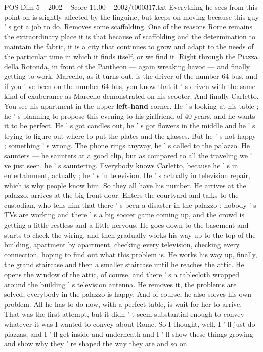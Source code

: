 \begin{textsample}{POS Dim 5 – 2002 – Score 11.00 – 2002/t000317.txt}
Everything he sees from this point on is slightly affected by the linguine, but keeps on moving because this guy ' s got a job to do.
Removes some scaffolding.
One of the reasons Rome remains the extraordinary place it is that because of scaffolding and the determination to maintain the fabric, it is a city that continues to grow and adapt to the needs of the particular time in which it finds itself, or we find it.
Right through the Piazza della Rotonda, in front of the Pantheon — again wreaking havoc — and finally getting to work.
Marcello, as it turns out, is the driver of the number 64 bus, and if you ' ve been on the number 64 bus, you know that it ' s driven with the same kind of exuberance as Marcello demonstrated on his scooter.
And finally Carletto.
You see his apartment in the upper \textbf{left-hand} corner.
He ' s looking at his table ; he ' s planning to propose this evening to his girlfriend of 40 years, and he wants it to be perfect.
He ' s got candles out, he ' s got flowers in the middle and he ' s trying to figure out where to put the plates and the glasses.
But he ' s not happy ; something ' s wrong.
The phone rings anyway, he ' s called to the palazzo.
He saunters — he saunters at a good clip, but as compared to all the traveling we ' ve just seen, he ' s sauntering.
Everybody knows Carletto, because he ' s in entertainment, actually ; he ' s in television.
He ' s actually in television repair, which is why people know him.
So they all have his number.
He arrives at the palazzo, arrives at the big front door.
Enters the courtyard and talks to the custodian, who tells him that there ' s been a disaster in the palazzo ; nobody ' s TVs are working and there ' s a big soccer game coming up, and the crowd is getting a little restless and a little nervous.
He goes down to the basement and starts to check the wiring, and then gradually works his way up to the top of the building, apartment by apartment, checking every television, checking every connection, hoping to find out what this problem is.
He works his way up, finally, the grand staircase and then a smaller staircase until he reaches the attic.
He opens the window of the attic, of course, and there ' s a tablecloth wrapped around the building ' s television antenna.
He removes it, the problems are solved, everybody in the palazzo is happy.
And of course, he also solves his own problem.
All he has to do now, with a perfect table, is wait for her to arrive.
That was the first attempt, but it didn ' t seem substantial enough to convey whatever it was I wanted to convey about Rome.
So I thought, well, I ' ll just do piazzas, and I ' ll get inside and underneath and I ' ll show these things growing and show why they ' re shaped the way they are and so on.

\end{textsample}
